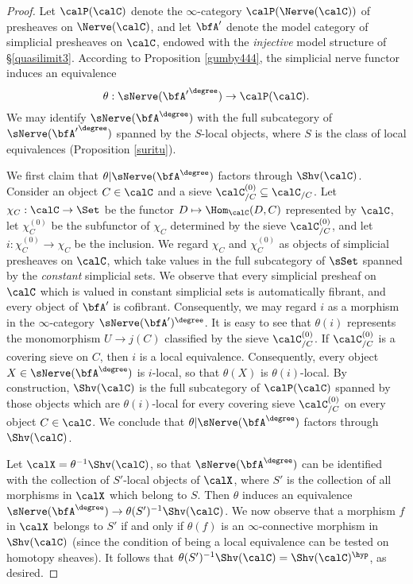 \begin{proof}
Let $\calP(\calC)$ denote the $\infty$-category $\calP(\Nerve(\calC))$ of presheaves on
$\Nerve(\calC)$, and let
$\bfA'$ denote the model category of simplicial presheaves on $\calC$, endowed with the {\em injective} model structure of \S \ref{quasilimit3}. According to Proposition \ref{gumby444}, 
the simplicial nerve functor induces an equivalence
$$ \theta: \sNerve ({\bfA'}^{\degree}) \rightarrow \calP(\calC).$$
We may identify $\sNerve(\bfA^{\degree})$ with the full subcategory of 
$\sNerve({\bfA'}^{\degree})$ spanned by the $S$-local objects, where $S$ is the class
of local equivalences (Proposition \ref{suritu}). 

We first claim that $\theta | \sNerve(\bfA^{\degree})$ factors
through $\Shv(\calC)$. Consider an object $C \in \calC$ and a sieve
$\calC^{(0)}_{/C} \subseteq \calC_{/C}$. Let $\chi_{C}: \calC \rightarrow \Set$ be the functor
$D \mapsto \Hom_{\calC}(D,C)$ represented by $\calC$, let $\chi_{C}^{(0)}$ be the subfunctor of $\chi_{C}$ determined by the sieve $\calC^{(0)}_{/C}$, and let $i: \chi_{C}^{(0)} \rightarrow \chi_{C}$ be the inclusion. We regard $\chi_{C}$ and $\chi_{C}^{(0)}$ as objects of
simplicial presheaves on $\calC$, which take values in the full subcategory 
of $\sSet$ spanned by the {\em constant} simplicial sets. We observe that
every simplicial presheaf on $\calC$ which is valued in constant simplicial sets
is automatically fibrant, and every object of $\bfA'$ is cofibrant. Consequently, we
may regard $i$ as a morphism in the $\infty$-category $\sNerve (\bfA')^{\degree}$.
It is easy to see that $\theta(i)$ represents the monomorphism
$U \rightarrow j(C)$ classified by the sieve $\calC^{(0)}_{/C}$. If $\calC^{(0)}_{/C}$ is a covering sieve on $C$, then $i$ is a local equivalence. Consequently, every object $X \in \sNerve (\bfA^{\degree})$ is $i$-local, so that $\theta(X)$ is $\theta(i)$-local. By construction, $\Shv(\calC)$ 
is the full subcategory of $\calP(\calC)$ spanned by those objects which are $\theta(i)$-local
for every covering sieve $\calC^{(0)}_{/C}$ on every object $C \in \calC$. We conclude
that $\theta | \sNerve(\bfA^{\degree})$ factors through $\Shv(\calC)$. 

Let $\calX = \theta^{-1} \Shv(\calC)$, so that $\sNerve(\bfA^{\degree})$ can be identified
with the collection of $S'$-local objects of $\calX$, where $S'$ is the collection of all morphisms
in $\calX$ which belong to $S$. Then $\theta$ induces an equivalence
$\sNerve (\bfA^{\degree}) \rightarrow \theta(S')^{-1} \Shv(\calC)$. We now observe
that a morphism $f$ in $\calX$ belongs to $S'$ if and only if $\theta(f)$ is an $\infty$-connective morphism in $\Shv(\calC)$ (since the condition of being a local equivalence can be tested on homotopy sheaves). It follows that $\theta(S')^{-1} \Shv(\calC) = \Shv(\calC)^{\hyp}$, as desired. 
\end{proof}

